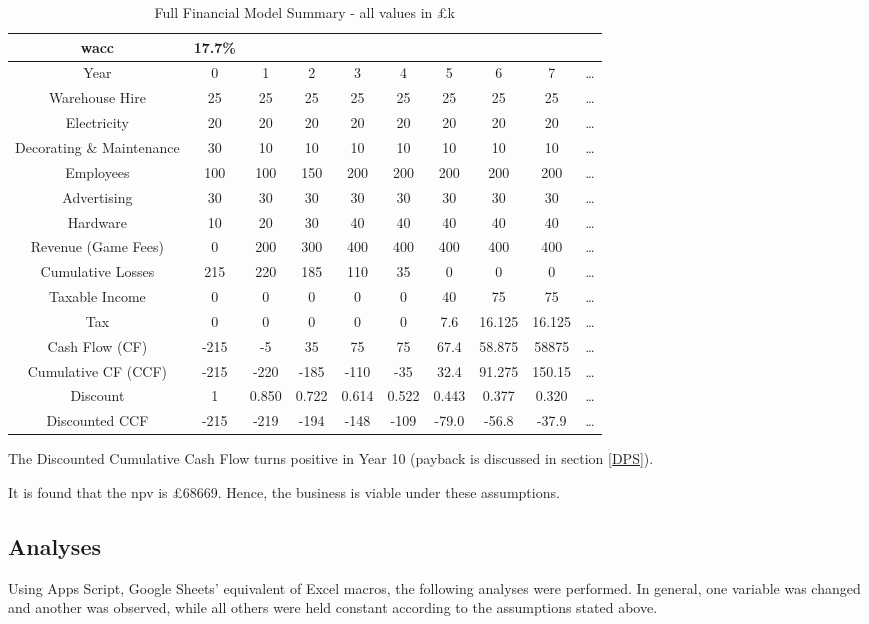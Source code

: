 \documentclass{report_template_oxford}
\begin{document}
\begin{table}[h]
\centering
\caption{Full Financial Model Summary - all values in £k}
\begin{tabular}{|c| c c c c c c c c c|}
\hline
\gls{wacc} & 17.7\% &&&&&&&&\\
\hline \hline
Year & 0 & 1 & 2 & 3 & 4 & 5 & 6 & 7 & \dots \\
\hline
Warehouse Hire & 25 & 25 & 25 & 25 & 25 & 25 & 25 & 25 & \dots \\
Electricity & 20 & 20 & 20 & 20 & 20 & 20 & 20 & 20 & \dots \\
Decorating \& Maintenance & 30 & 10 & 10 & 10 & 10 & 10 & 10 & 10 & \dots \\
Employees & 100 & 100 & 150 & 200 & 200 & 200 & 200 & 200 & \dots \\
Advertising & 30 & 30 & 30 & 30 & 30 & 30 & 30 & 30 &\dots \\
Hardware & 10 & 20 & 30 & 40 & 40 & 40 & 40 & 40 & \dots \\
Revenue (Game Fees) & 0 & 200 & 300 & 400 & 400 & 400 & 400 & 400 & \dots \\

\hline \hline
Cumulative Losses & 215 & 220 & 185 & 110 & 35 & 0 & 0 & 0 & \dots \\
Taxable Income & 0 & 0 & 0 & 0 & 0 & 40 & 75 & 75 & \dots \\
Tax & 0 & 0 & 0 & 0 & 0 & 7.6 & 16.125 & 16.125 & \dots \\
\hline \hline
Cash Flow (CF) &-215&-5&35&75&75&67.4&58.875&58875&\dots \\
Cumulative CF (CCF) &-215&-220&-185&-110&-35&32.4&91.275&150.15&\dots \\
\hline \hline
Discount & 1 & 0.850 & 0.722 & 0.614 & 0.522 & 0.443 & 0.377 & 0.320 & \dots \\

\hline \hline
Discounted CCF& -215&-219&-194&-148&-109&-79.0&-56.8&-37.9& \dots \\
\hline
\end{tabular}
\label{tab:model}
\end{table}

\noindent The Discounted Cumulative Cash Flow turns positive in Year 10 (payback is discussed in section \ref{DPS}).\newline


\noindent It is found that the \gls{npv} is £68669. Hence, the business is viable under these assumptions.

\subsection{Analyses} \label{anal}
Using Apps Script, Google Sheets' equivalent of Excel macros, the following analyses were performed. In general, one variable was changed and another was observed, while all others were held constant according to the assumptions stated above.
\end{document}

